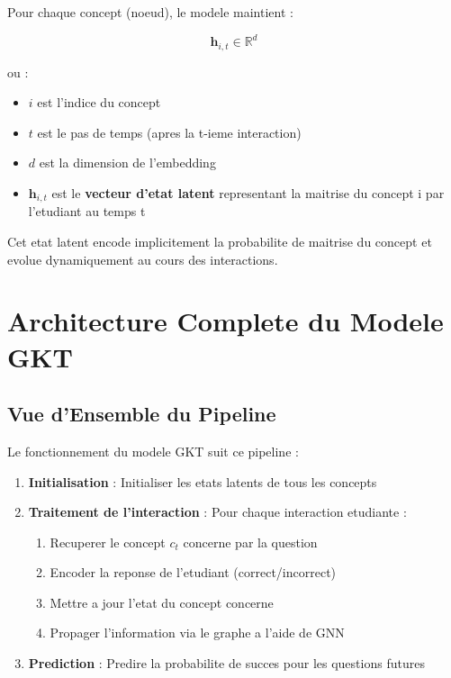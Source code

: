 \documentclass[11pt, a4paper]{article}
\begin{document}
Pour chaque concept (noeud), le modele maintient :

\begin{equation}
    \mathbf{h}_{i,t} \in \mathbb{R}^d
\end{equation}

ou :
\begin{itemize}
    \item $i$ est l'indice du concept
    \item $t$ est le pas de temps (apres la t-ieme interaction)
    \item $d$ est la dimension de l'embedding
    \item $\mathbf{h}_{i,t}$ est le \textbf{vecteur d'etat latent} representant la maitrise du concept i par l'etudiant au temps t
\end{itemize}

Cet etat latent encode implicitement la probabilite de maitrise du concept et evolue dynamiquement au cours des interactions.

\section{Architecture Complete du Modele GKT}

\subsection{Vue d'Ensemble du Pipeline}

Le fonctionnement du modele GKT suit ce pipeline :

\begin{enumerate}
    \item \textbf{Initialisation} : Initialiser les etats latents de tous les concepts
    \item \textbf{Traitement de l'interaction} : Pour chaque interaction etudiante :
          \begin{enumerate}
              \item Recuperer le concept $c_t$ concerne par la question
              \item Encoder la reponse de l'etudiant (correct/incorrect)
              \item Mettre a jour l'etat du concept concerne
              \item Propager l'information via le graphe a l'aide de GNN
          \end{enumerate}
    \item \textbf{Prediction} : Predire la probabilite de succes pour les questions futures
\end{enumerate}
\end{document}
